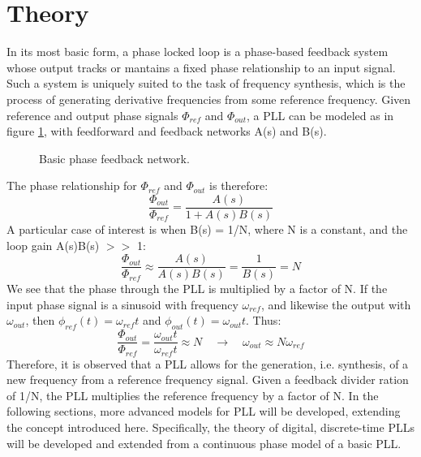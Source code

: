 \section{Theory}\label{theory}
In its most basic form, a phase locked loop is a phase-based feedback system whose output tracks or mantains a fixed phase relationship to an input signal. Such a system is uniquely suited to the task of frequency synthesis, which is the process of generating derivative frequencies from some reference frequency. Given reference and output phase signals $\Phi_{ref}$ and $\Phi_{out}$, a PLL can be modeled as in figure \ref{fig:basic_fb}, with feedforward and feedback networks A(s) and B(s). 
\begin{figure}[htb!]
	\center
	\caption{Basic phase feedback network.}
	\label{fig:basic_fb}
\end{figure}
\FloatBarrier
The phase relationship for $\Phi_{ref}$ and $\Phi_{out}$ is therefore:
\begin{equation}
	\frac{\Phi_{out}}{\Phi_{ref}} = \frac{A(s)}{1+A(s)B(s)}
\end{equation}
A particular case of interest is when B(s) = 1/N, where N is a constant, and the loop gain A(s)B(s) $>>$ 1:
\begin{equation}\label{mult_by_n}
	\frac{\Phi_{out}}{\Phi_{ref}} \approx \frac{A(s)}{A(s)B(s)} = \frac{1}{B(s)} = N
\end{equation}
We see that the phase through the PLL is multiplied by a factor of N. If the input phase signal is a sinusoid with frequency $\omega_{ref}$, and likewise the output with $\omega_{out}$, then $\phi_{ref}(t)=\omega_{ref}t$ and $\phi_{out}(t)=\omega_{out}t$. Thus:
\begin{equation}\label{mult_by_n}
	\frac{\Phi_{out}}{\Phi_{ref}} = \frac{\omega_{out}t}{\omega_{ref}t} \approx N \hspace{1em} \rightarrow \hspace{1em} \omega_{out} \approx N\omega_{ref}
\end{equation}
Therefore, it is observed that a PLL allows for the generation, i.e. synthesis, of a new frequency from a reference frequency signal. Given a feedback divider ration of 1/N, the PLL multiplies the reference frequency by a factor of N. In the following sections, more advanced models for PLL will be developed, extending the concept introduced here. Specifically, the theory of digital, discrete-time PLLs will be developed and extended from a continuous phase model of a basic PLL.

